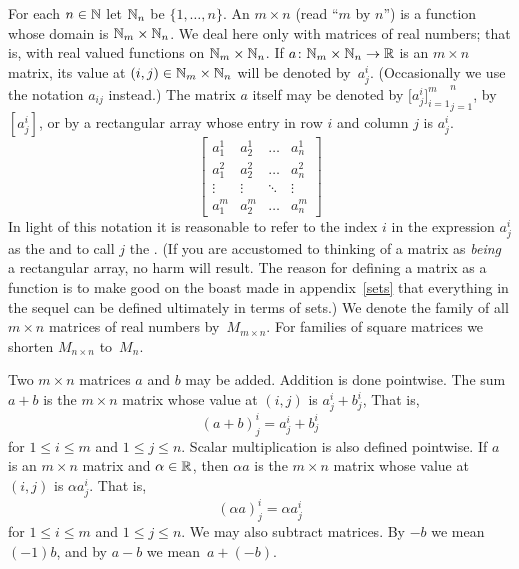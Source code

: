 For each $n \in \mathbb{N}$ let $\mathbb{N}_n$ be $\{1, \dots, n\}$.  An $m \times n$ (read ``$m$ by $n$'')
 is a function whose domain is $\mathbb{N}_m \times \mathbb{N}_n$.  We deal here only with matrices
of real numbers; that is, with real valued functions on $\mathbb{N}_m \times \mathbb{N}_n$.  If $a \colon
\mathbb{N}_m \times \mathbb{N}_n \rightarrow \mathbb{R}$ is an $m \times n$ matrix, its value at $(i,j) \in \mathbb{N}_m \times \mathbb{N}_n$
will be denoted by~$a_j^i$.  (Occasionally we use the notation $a_{ij}$ instead.)  The matrix
$a$ itself may be denoted by ${\bigl[a_j^i\bigr]_{i=1}^m}_{j=1}^n$,
by $[a_j^i]$,  or by a rectangular array whose entry in row $i$ and
column $j$ is $a_j^i$.
 \[ \begin{bmatrix}
             a_1^1  &  a_2^1  &  \hdots &  a_n^1  \\
             a_1^2  &  a_2^2  &  \hdots &  a_n^2  \\
             \vdots &  \vdots &  \ddots &  \vdots \\
             a_1^m  &  a_2^m  &  \hdots &  a_n^m
    \end{bmatrix} \]
In light of this notation it is reasonable to refer to the index $i$ in the expression $a_j^i$
as the
 and to call $j$ the
.  (If you are accustomed to thinking of a matrix as \emph{being} a
rectangular array, no harm will result.  The reason for defining a matrix as a function is to
make good on the boast made in appendix~\ref{sets} that everything in the sequel can be
defined ultimately in terms of sets.) We denote the family of all $m \times n$ matrices of
real numbers
by~$M_{m \times n}$.  For families of square matrices we shorten $M_{n \times n}$
to~$M_n$.

Two $m \times n$ matrices $a$ and $b$ may be added. Addition is done pointwise. The sum
$a+b$ is the $m \times n$ matrix whose
value at $(i,j)$ is $a_j^i + b_j^i$,  That is,
  \[ (a + b)_j^i =  a_j^i + b_j^i \]
for $1 \le i \le m$ and $1 \le j \le n$.  Scalar multiplication is also defined pointwise.  If
$a$ is an $m \times n$ matrix and $\alpha \in \mathbb{R}$, then
$\alpha a$ is the $m \times n$ matrix whose
value at $(i,j)$ is $\alpha a_j^i$.  That is,
  \[ (\alpha a)_j^i  =  \alpha a_j^i \]
for $1 \le i \le m$ and $1 \le j \le n$.  We may also subtract matrices. By $-b$ we mean
$(-1)b$, and by $a - b$ we mean~$a + (-b)$.

